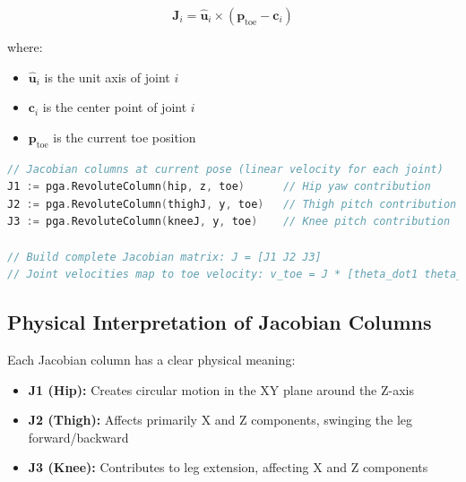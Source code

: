 \documentclass[11pt]{article}
\begin{document}
\[\mathbf{J}_i = \hat{\mathbf{u}}_i \times (\mathbf{p}_{\text{toe}} - \mathbf{c}_i)\]

where:
\begin{itemize}
    \item $\hat{\mathbf{u}}_i$ is the unit axis of joint $i$
    \item $\mathbf{c}_i$ is the center point of joint $i$  
    \item $\mathbf{p}_{\text{toe}}$ is the current toe position
\end{itemize}

\begin{lstlisting}[language=Go, caption=Jacobian computation for velocity analysis]
// Jacobian columns at current pose (linear velocity for each joint)
J1 := pga.RevoluteColumn(hip, z, toe)      // Hip yaw contribution
J2 := pga.RevoluteColumn(thighJ, y, toe)   // Thigh pitch contribution  
J3 := pga.RevoluteColumn(kneeJ, y, toe)    // Knee pitch contribution

// Build complete Jacobian matrix: J = [J1 J2 J3]
// Joint velocities map to toe velocity: v_toe = J * [theta_dot1 theta_dot2 theta_dot3]^T
\end{lstlisting}

\subsection{Physical Interpretation of Jacobian Columns}

Each Jacobian column has a clear physical meaning:

\begin{itemize}
    \item \textbf{J1 (Hip):} Creates circular motion in the XY plane around the Z-axis
    \item \textbf{J2 (Thigh):} Affects primarily X and Z components, swinging the leg forward/backward
    \item \textbf{J3 (Knee):} Contributes to leg extension, affecting X and Z components
\end{itemize}
\end{document}
